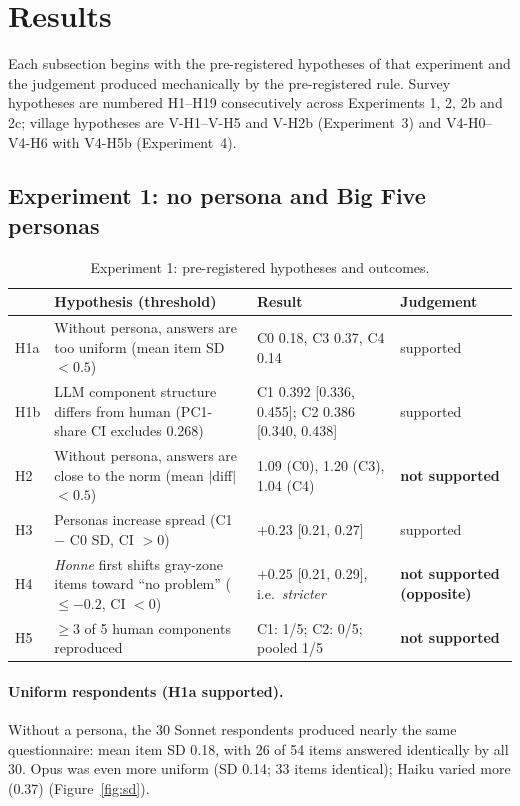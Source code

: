 \documentclass[11pt]{article}
\begin{document}
\section{Results}

Each subsection begins with the pre-registered hypotheses of that experiment and the judgement produced mechanically by the pre-registered rule. Survey hypotheses are numbered H1--H19 consecutively across Experiments 1, 2, 2b and 2c; village hypotheses are V-H1--V-H5 and V-H2b (Experiment~3) and V4-H0--V4-H6 with V4-H5b (Experiment~4).

\subsection{Experiment 1: no persona and Big Five personas}

\begin{table}[!htbp]
\centering\small
\caption{Experiment 1: pre-registered hypotheses and outcomes.}
\label{tab:hyp1}
\begin{tabularx}{\textwidth}{@{}lLLl@{}}
\toprule
 & Hypothesis (threshold) & Result & Judgement \\
\midrule
H1a & Without persona, answers are too uniform (mean item SD $<0.5$) & C0 0.18, C3 0.37, C4 0.14 & supported \\
H1b & LLM component structure differs from human (PC1-share CI excludes 0.268) & C1 0.392 [0.336, 0.455]; C2 0.386 [0.340, 0.438] & supported \\
H2 & Without persona, answers are close to the norm (mean $|$diff$|$ $<0.5$) & 1.09 (C0), 1.20 (C3), 1.04 (C4) & \textbf{not supported} \\
H3 & Personas increase spread (C1 $-$ C0 SD, CI $>0$) & $+0.23$ [0.21, 0.27] & supported \\
H4 & \emph{Honne} first shifts gray-zone items toward ``no problem'' ($\le -0.2$, CI $<0$) & $+0.25$ [0.21, 0.29], i.e.\ \emph{stricter} & \textbf{not supported (opposite)} \\
H5 & $\ge 3$ of 5 human components reproduced & C1: 1/5; C2: 0/5; pooled 1/5 & \textbf{not supported} \\
\bottomrule
\end{tabularx}
\end{table}

\paragraph{Uniform respondents (H1a supported).}
Without a persona, the 30 Sonnet respondents produced nearly the same questionnaire: mean item SD 0.18, with 26 of 54 items answered identically by all 30. Opus was even more uniform (SD 0.14; 33 items identical); Haiku varied more (0.37) (Figure~\ref{fig:sd}).
\end{document}
